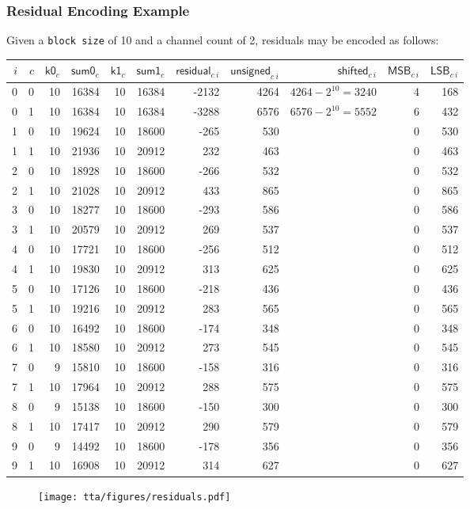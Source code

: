 \subsubsection{Residual Encoding Example}
Given a \texttt{block size} of 10 and a channel count of 2,
residuals may be encoded as follows:
\begin{table}[h]
  {
    \begin{tabular}{rrrrrrrr>{$}r<{$}rr}
      $i$ & $c$ & $\textsf{k0}_{c}$ & $\textsf{sum0}_{c}$ &
      $\textsf{k1}_{c}$ & $\textsf{sum1}_{c}$ &
      $\textsf{residual}_{c~i}$ & $\textsf{unsigned}_{c~i}$ &
      \textsf{shifted}_{c~i} & $\textsf{MSB}_{c~i}$ & $\textsf{LSB}_{c~i}$ \\
      \hline
      0 & 0 & 10 & 16384 & 10 & 16384 & -2132 & 4264 &
      4264 - 2 ^ {10} = 3240 & 4 & 168 \\
      0 & 1 & 10 & 16384 & 10 & 16384 & -3288 & 6576 &
      6576 - 2 ^ {10} = 5552 & 6 & 432 \\
      1 & 0 & 10 & 19624 & 10 & 18600 & -265 & 530 &
      & 0 & 530 \\
      1 & 1 & 10 & 21936 & 10 & 20912 & 232 & 463 &
      & 0 & 463 \\
      2 & 0 & 10 & 18928 & 10 & 18600 & -266 & 532 &
      & 0 & 532 \\
      2 & 1 & 10 & 21028 & 10 & 20912 & 433 & 865 &
      & 0 & 865 \\
      3 & 0 & 10 & 18277 & 10 & 18600 & -293 & 586 &
      & 0 & 586 \\
      3 & 1 & 10 & 20579 & 10 & 20912 & 269 & 537 &
      & 0 & 537 \\
      4 & 0 & 10 & 17721 & 10 & 18600 & -256 & 512 &
      & 0 & 512 \\
      4 & 1 & 10 & 19830 & 10 & 20912 & 313 & 625 &
      & 0 & 625 \\
      5 & 0 & 10 & 17126 & 10 & 18600 & -218 & 436 &
      & 0 & 436 \\
      5 & 1 & 10 & 19216 & 10 & 20912 & 283 & 565 &
      & 0 & 565 \\
      6 & 0 & 10 & 16492 & 10 & 18600 & -174 & 348 &
      & 0 & 348 \\
      6 & 1 & 10 & 18580 & 10 & 20912 & 273 & 545 &
      & 0 & 545 \\
      7 & 0 & 9 & 15810 & 10 & 18600 & -158 & 316 &
      & 0 & 316 \\
      7 & 1 & 10 & 17964 & 10 & 20912 & 288 & 575 &
      & 0 & 575 \\
      8 & 0 & 9 & 15138 & 10 & 18600 & -150 & 300 &
      & 0 & 300 \\
      8 & 1 & 10 & 17417 & 10 & 20912 & 290 & 579 &
      & 0 & 579 \\
      9 & 0 & 9 & 14492 & 10 & 18600 & -178 & 356 &
      & 0 & 356 \\
      9 & 1 & 10 & 16908 & 10 & 20912 & 314 & 627 &
      & 0 & 627 \\
    \end{tabular}
  }
\end{table}
\begin{figure}[h]
  \texttt{[image: tta/figures/residuals.pdf]}
\end{figure}
